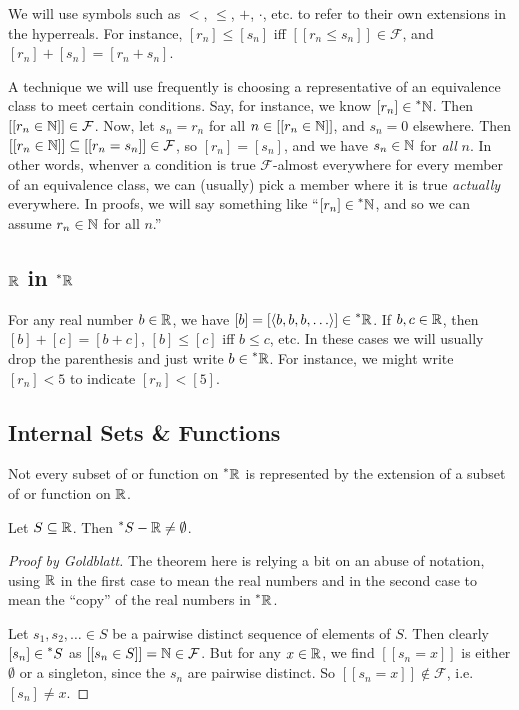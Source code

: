 We will use symbols such as $<$, $\leq$, $+$, $\cdot$, etc. to refer to their own extensions in the hyperreals. For instance, $[r_n] \leq [s_n]$ iff $[[r_n \leq s_n]] \in \mathcal{F}$, and $[r_n] + [s_n] = [r_n + s_n]$.

A technique we will use frequently is choosing a representative of an equivalence class to meet certain conditions. Say, for instance, we know $[r_n] \in \prescript{*}{}{\mathbb{N}}$. Then $[[r_n \in \mathbb{N}]] \in \mathcal{F}$. Now, let $s_n = r_n$ for all $n \in [[r_n \in \mathbb{N}]]$, and $s_n = 0$ elsewhere. Then $[[r_n \in \mathbb{N}]] \subseteq [[r_n = s_n]] \in \mathcal{F}$, so $[r_n] = [s_n]$, and we have $s_n \in \mathbb{N}$ for \textit{all} $n$. In other words, whenver a condition is true $\mathcal{F}$-almost everywhere for every member of an equivalence class, we can (usually) pick a member where it is true \textit{actually} everywhere. In proofs, we will say something like ``$[r_n] \in \prescript{*}{}{\mathbb{N}}$, and so we can assume $r_n \in \mathbb{N}$ for all $n$.''

\subsection{\texorpdfstring{$\mathbb{R}$}{R} in \texorpdfstring{$\prescript{*}{}{\mathbb{R}}$}{*R}}
For any real number $b \in \mathbb{R}$, we have $[b] = [\langle b, b, b, \ldots \rangle] \in \prescript{*}{}{\mathbb{R}}$. If $b, c \in \mathbb{R}$, then $[b] + [c] = [b + c]$, $[b] \leq [c]$ iff $b \leq c$, etc. In these cases we will usually drop the parenthesis and just write $b \in \prescript{*}{}{\mathbb{R}}$. For instance, we might write $[r_n] < 5$ to indicate $[r_n] < [5]$.

\subsection{Internal Sets \& Functions}
Not every subset of or function on $\prescript{*}{}{\mathbb{R}}$ is represented by the extension of a subset of or function on $\mathbb{R}$.

\begin{thm}
    Let $S \subseteq \mathbb{R}$. Then $\prescript{*}{}{S} - \mathbb{R} \neq \emptyset$.
\end{thm}

\begin{proof}[Proof by Goldblatt]
    The theorem here is relying a bit on an abuse of notation, using $\mathbb{R}$ in the first case to mean the real numbers and in the second case to mean the ``copy'' of the real numbers in $\prescript{*}{}{\mathbb{R}}$.

    Let $s_1, s_2, \ldots \in S$ be a pairwise distinct sequence of elements of $S$. Then clearly $[s_n] \in \prescript{*}{}{S}$ as $[[s_n \in S]] = \mathbb{N} \in \mathcal{F}$. But for any $x \in \mathbb{R}$, we find $[[s_n = x]]$ is either $\emptyset$ or a singleton, since the $s_n$ are pairwise distinct. So $[[s_n = x]] \notin \mathcal{F}$, i.e. $[s_n] \neq x$.
\end{proof}

